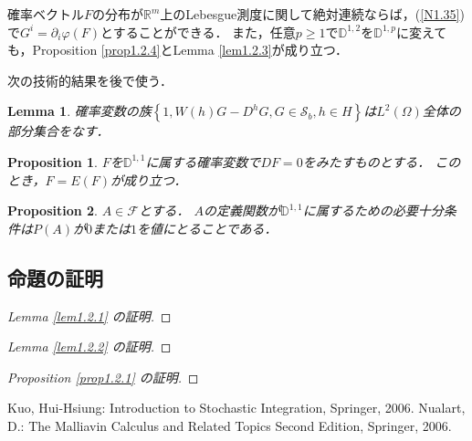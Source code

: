 \documentclass[a4paper,10pt]{jsarticle}
\theoremstyle{plain}
\newtheorem{lemma}{Lemma}
\newtheorem{proposition}{Proposition}
\begin{document}
確率ベクトル$F$の分布が$\mathbb{R}^m$上のLebesgue測度に関して絶対連続ならば，(\ref{N1.35})で$G^i=\partial_i\varphi(F)$とすることができる．
また，任意$p\ge1$で$\mathbb{D}^{1,2}$を$\mathbb{D}^{1,p}$に変えても，Proposition \ref{prop1.2.4}とLemma \ref{lem1.2.3}が成り立つ．

次の技術的結果を後で使う．
\begin{lemma}\label{lem1.2.4}
確率変数の族$\left\{1,W(h)G-D^hG,G\in\mathcal{S}_b,h\in H\right\}$は$L^2(\Omega)$全体の部分集合をなす．
\end{lemma}

\begin{proposition}\label{prop1.2.5}
$F$を$\mathbb{D}^{1,1}$に属する確率変数で$DF=0$をみたすものとする．
このとき，$F=E(F)$が成り立つ．
\end{proposition}

\begin{proposition}\label{prop1.2.6}
$A\in\mathcal{F}$とする．
$A$の定義関数が$\mathbb{D}^{1,1}$に属するための必要十分条件は$P(A)$が$0$または$1$を値にとることである．
\end{proposition}

\subsection{命題の証明}
\begin{proof}[Lemma \ref{lem1.2.1} の証明]
\end{proof}
\begin{proof}[Lemma \ref{lem1.2.2} の証明]
\end{proof}
\begin{proof}[Proposition \ref{prop1.2.1} の証明]
\end{proof}

\begin{thebibliography}{5}
	 Kuo, Hui-Hsiung: Introduction to Stochastic Integration, Springer, 2006.
	 Nualart, D.: The Malliavin Calculus and Related Topics Second Edition, Springer, 2006.
\end{thebibliography}
\end{document}
